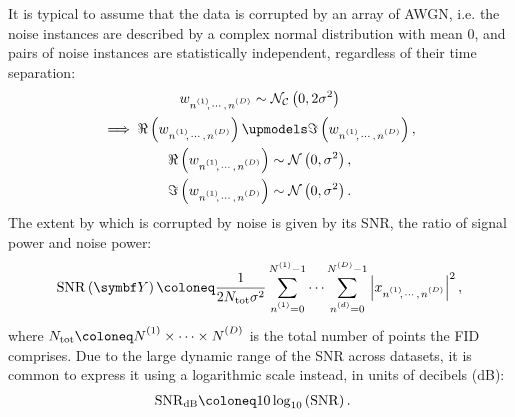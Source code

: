 It is typical to assume that the data is corrupted by an array of \ac{AWGN},
i.e. the noise instances are described by a complex normal distribution with
mean 0, and pairs of noise instances are statistically independent, regardless
of their time separation:
\begin{subequations}
    \begin{gather}
        \wnonenD \sim
        \mathcal{N_C}\left(0, 2\sigma^2\right) \\
        \begin{gathered}
            \implies \Re\left(\wnonenD\right) \upmodels \Im\left(\wnonenD\right),\\
             \Re\left(\wnonenD\right) \sim \mathcal{N}\left(0, \sigma^2\right),\\
             \Im\left(\wnonenD\right) \sim \mathcal{N}\left(0, \sigma^2\right). \\
        \end{gathered}
    \end{gather}
\end{subequations}
The extent by which  is corrupted by noise is given by its \ac{SNR},
the ratio of signal power and noise power:
\begin{equation}
    \SNR\left(\bY\right) \coloneq
        \frac{1}{2 N_{\text{tot}} \sigma^2}
        \sum_{\none=0}^{\None-1} \cdots \sum_{\nd=0}^{\ND-1}
        \left \lvert \xnonenD \right \rvert^2,
\end{equation}
where $N_{\text{tot}} \coloneq \None \times \cdots \times \ND$ is the total
number of points the \ac{FID} comprises. Due to the large dynamic range of the
\ac{SNR} across datasets, it is common to express it using a logarithmic scale
instead, in units of decibels (\unit{\deci\bel}):
\begin{equation}
    \begin{split}
        \SNR_{\unit{\deci\bel}} &\coloneq 10 \log_{10} \left(\SNR\right).
    \end{split}
\end{equation}
